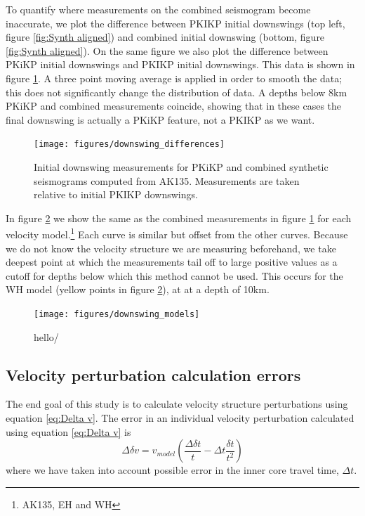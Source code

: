 \documentclass[11pt,a4paper]{article}
\begin{document}
To quantify where measurements on the combined seismogram become inaccurate, we plot the difference between PKIKP initial downswings (top left, figure \ref{fig:Synth aligned}) and combined initial downswing (bottom, figure \ref{fig:Synth aligned}). On the same figure we also plot the difference between PKiKP initial downswings and PKIKP initial downswings. This data is shown in figure \ref{fig:Downswing differences}. A three point moving average is applied in order to smooth the data; this does not significantly change the distribution of data. A depths below 8km PKiKP and combined measurements coincide, showing that in these cases the final downswing is actually a PKiKP feature, not a PKIKP as we want.

\begin{figure}
	\centering
	\texttt{[image: figures/downswing\_differences]}
	\caption{Initial downswing measurements for PKiKP and combined synthetic seismograms computed from AK135. Measurements are taken relative to initial PKIKP downswings.}
	\label{fig:Downswing differences}
\end{figure}

In figure \ref{fig:Downswing models} we show the same as the combined measurements in figure \ref{fig:Downswing differences} for each velocity model.\footnote{AK135, EH and WH} Each curve is similar but offset from the other curves. Because we do not know the velocity structure we are measuring beforehand, we take deepest point at which the measurements tail off to large positive values as a cutoff for depths below which this method cannot be used. This occurs for the WH model (yellow points in figure \ref{fig:Downswing models}), at at a depth of 10km.

\begin{figure}
	\centering
	\texttt{[image: figures/downswing\_models]}
	\caption{hello/}
	\label{fig:Downswing models}
\end{figure}

\subsection{Velocity perturbation calculation errors}
The end goal of this study is to calculate velocity structure perturbations using equation \eqref{eq:Delta v}. The error in an individual velocity perturbation calculated using equation \eqref{eq:Delta v} is
\begin{equation}
	\Delta \delta v = v_{model} \left ( \frac{\Delta \delta t}{t} - \Delta t \frac{\delta t}{t^{2}} \right )
	\label{eq:Velocity error}
\end{equation}
where we have taken into account possible error in the inner core travel time, $\Delta t$.
\end{document}
